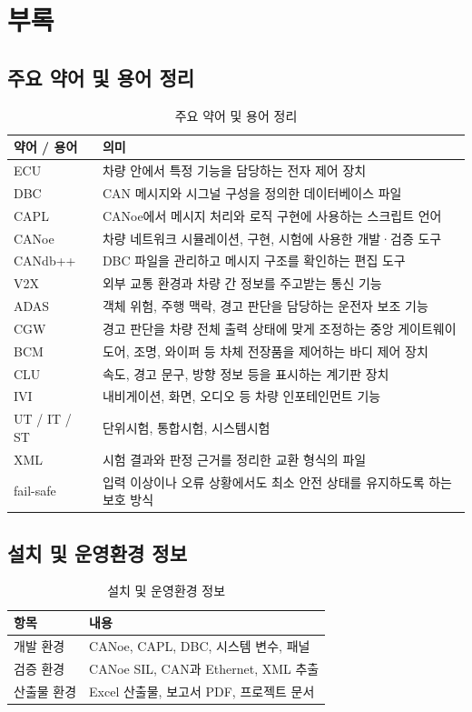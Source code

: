 \documentclass[11pt,a4paper]{article}
\begin{document}
\clearpage
\section{부록}

\subsection{주요 약어 및 용어 정리}
\begin{table}[H]
\centering
\begin{tabularx}{\textwidth}{|p{22mm}|X|}
\hline
\textbf{약어 / 용어} & \textbf{의미} \\ \hline
ECU & 차량 안에서 특정 기능을 담당하는 전자 제어 장치 \\ \hline
DBC & CAN 메시지와 시그널 구성을 정의한 데이터베이스 파일 \\ \hline
CAPL & CANoe에서 메시지 처리와 로직 구현에 사용하는 스크립트 언어 \\ \hline
CANoe & 차량 네트워크 시뮬레이션, 구현, 시험에 사용한 개발·검증 도구 \\ \hline
CANdb++ & DBC 파일을 관리하고 메시지 구조를 확인하는 편집 도구 \\ \hline
V2X & 외부 교통 환경과 차량 간 정보를 주고받는 통신 기능 \\ \hline
ADAS & 객체 위험, 주행 맥락, 경고 판단을 담당하는 운전자 보조 기능 \\ \hline
CGW & 경고 판단을 차량 전체 출력 상태에 맞게 조정하는 중앙 게이트웨이 \\ \hline
BCM & 도어, 조명, 와이퍼 등 차체 전장품을 제어하는 바디 제어 장치 \\ \hline
CLU & 속도, 경고 문구, 방향 정보 등을 표시하는 계기판 장치 \\ \hline
IVI & 내비게이션, 화면, 오디오 등 차량 인포테인먼트 기능 \\ \hline
UT / IT / ST & 단위시험, 통합시험, 시스템시험 \\ \hline
XML & 시험 결과와 판정 근거를 정리한 교환 형식의 파일 \\ \hline
fail-safe & 입력 이상이나 오류 상황에서도 최소 안전 상태를 유지하도록 하는 보호 방식 \\ \hline
\end{tabularx}
\caption{주요 약어 및 용어 정리}
\end{table}

\subsection{설치 및 운영환경 정보}
\begin{table}[H]
\centering
\begin{tabularx}{\textwidth}{|p{38mm}|X|}
\hline
\textbf{항목} & \textbf{내용} \\ \hline
개발 환경 & CANoe, CAPL, DBC, 시스템 변수, 패널 \\ \hline
검증 환경 & CANoe SIL, CAN과 Ethernet, XML 추출 \\ \hline
산출물 환경 & Excel 산출물, 보고서 PDF, 프로젝트 문서 \\ \hline
\end{tabularx}
\caption{설치 및 운영환경 정보}
\end{table}
\end{document}
